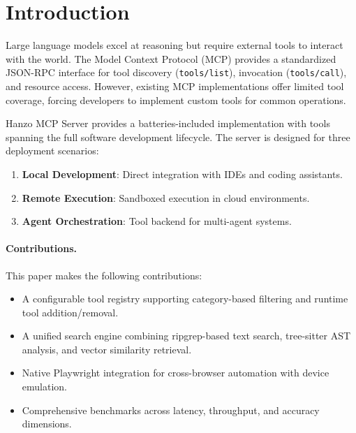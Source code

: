 \section{Introduction}


Large language models excel at reasoning but require external tools to interact with the world. The Model Context Protocol (MCP) provides a standardized JSON-RPC interface for tool discovery (\texttt{tools/list}), invocation (\texttt{tools/call}), and resource access. However, existing MCP implementations offer limited tool coverage, forcing developers to implement custom tools for common operations.

Hanzo MCP Server provides a batteries-included implementation with tools spanning the full software development lifecycle. The server is designed for three deployment scenarios:
\begin{enumerate}
    \item \textbf{Local Development}: Direct integration with IDEs and coding assistants.
    \item \textbf{Remote Execution}: Sandboxed execution in cloud environments.
    \item \textbf{Agent Orchestration}: Tool backend for multi-agent systems.
\end{enumerate}

\paragraph{Contributions.} This paper makes the following contributions:
\begin{itemize}
    \item A configurable tool registry supporting category-based filtering and runtime tool addition/removal.
    \item A unified search engine combining ripgrep-based text search, tree-sitter AST analysis, and vector similarity retrieval.
    \item Native Playwright integration for cross-browser automation with device emulation.
    \item Comprehensive benchmarks across latency, throughput, and accuracy dimensions.
\end{itemize}

